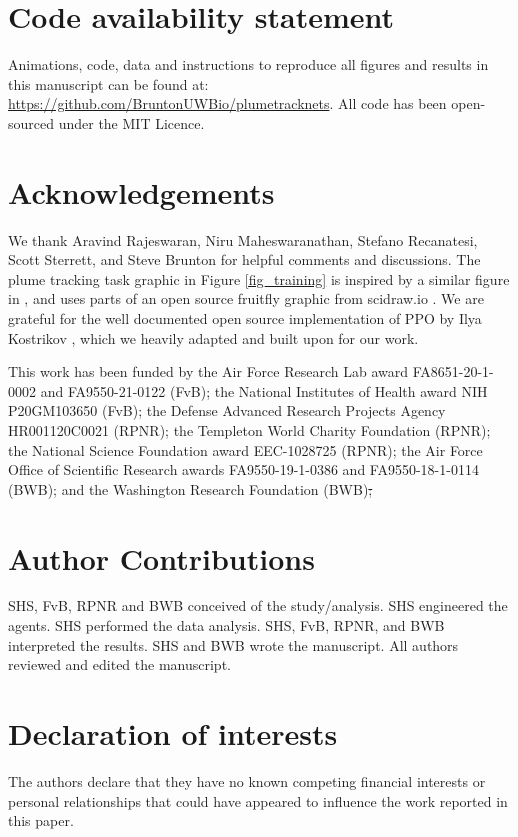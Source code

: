 \documentclass[5p,twocolumn,authoryear]{elsarticle}
\providecommand{\DIFaddtex}[1]{{\protect\color{blue}\uwave{#1}}} %
\providecommand{\DIFdeltex}[1]{{\protect\color{red}\sout{#1}}}                      %
\providecommand{\DIFaddbegin}{} %
\providecommand{\DIFaddend}{} %
\providecommand{\DIFdelbegin}{} %
\providecommand{\DIFdelend}{} %
\providecommand{\DIFadd}[1]{\texorpdfstring{\DIFaddtex{#1}}{#1}} %
\providecommand{\DIFdel}[1]{\texorpdfstring{\DIFdeltex{#1}}{}} %
\newcommand{\DIFscaledelfig}{0.5}
\newlength{\DIFdelgraphicswidth} %
\newlength{\DIFdelgraphicsheight} %
\newcommand{\DIFaddincludegraphics}[2][]{{\color{blue}\fbox{\DIFOincludegraphics[#1]{#2}}}} %
\newcommand{\DIFdelincludegraphics}[2][]{%
\sbox{\DIFdelgraphicsbox}{\DIFOincludegraphics[#1]{#2}}%
\settoboxwidth{\DIFdelgraphicswidth}{\DIFdelgraphicsbox} %
\settoboxtotalheight{\DIFdelgraphicsheight}{\DIFdelgraphicsbox} %
\scalebox{\DIFscaledelfig}{%
\parbox[b]{\DIFdelgraphicswidth}{\usebox{\DIFdelgraphicsbox}\\[-\baselineskip] \rule{\DIFdelgraphicswidth}{0em}}\llap{\resizebox{\DIFdelgraphicswidth}{\DIFdelgraphicsheight}{%
\setlength{\unitlength}{\DIFdelgraphicswidth}%
\begin{picture}(1,1)%
\thicklines\linethickness{2pt} %
{\color[rgb]{1,0,0}\put(0,0){\framebox(1,1){}}}%
{\color[rgb]{1,0,0}\put(0,0){\line( 1,1){1}}}%
{\color[rgb]{1,0,0}\put(0,1){\line(1,-1){1}}}%
\end{picture}%
}\hspace*{3pt}}} %
} %
\DeclareRobustCommand{\DIFaddbegin}{\DIFOaddbegin \let\includegraphics\DIFaddincludegraphics} %
\DeclareRobustCommand{\DIFaddend}{\DIFOaddend \let\includegraphics\DIFOincludegraphics} %
\DeclareRobustCommand{\DIFdelbegin}{\DIFOdelbegin \let\includegraphics\DIFdelincludegraphics} %
\DeclareRobustCommand{\DIFdelend}{\DIFOaddend \let\includegraphics\DIFOincludegraphics} %
\begin{document}
\section*{Code availability statement}
Animations, code, data and instructions to reproduce all figures and results in this manuscript can be found at: \\ \url{https://github.com/BruntonUWBio/plumetracknets}.
All code has been open-sourced under the MIT Licence.


\section*{Acknowledgements}
We thank Aravind Rajeswaran, Niru Maheswaranathan, Stefano Recanatesi, Scott Sterrett, and Steve Brunton for helpful comments and discussions.
The plume tracking task graphic in Figure \ref{fig_training} is inspired by a similar figure in \cite{baker2018algorithms}, and uses parts of an open source fruitfly graphic from scidraw.io \citep{costa_gil_2020_3926137}.
We are grateful for the well documented open source implementation of PPO by Ilya Kostrikov \citep{kostrikov2018pytorch}, which we heavily adapted and built upon for our work.

This work has been funded by 
the Air Force Research Lab award FA8651-20-1-0002 and FA9550-21-0122 (FvB); 
the National Institutes of Health award NIH P20GM103650 (FvB);
the Defense Advanced Research Projects Agency HR001120C0021 (RPNR); 
the Templeton World Charity Foundation (RPNR); 
the National Science Foundation award EEC-1028725 (RPNR); 
the Air Force Office of Scientific Research awards FA9550-19-1-0386 and FA9550-18-1-0114 (BWB); 
and the Washington Research Foundation (BWB)\DIFdelbegin \DIFdel{;
}\DIFdelend \DIFaddbegin \DIFadd{.
}\DIFaddend 


\section*{Author Contributions}
SHS, FvB, RPNR and BWB conceived of the study/analysis. 
SHS engineered the agents. 
SHS performed the data analysis. 
SHS, FvB, RPNR, and BWB interpreted the results. 
SHS and BWB wrote the manuscript. 
All authors reviewed and edited the manuscript. 

\section*{Declaration of interests}
The authors declare that they have no known competing financial interests or personal relationships that could have appeared to influence the work reported in this paper.
\end{document}
